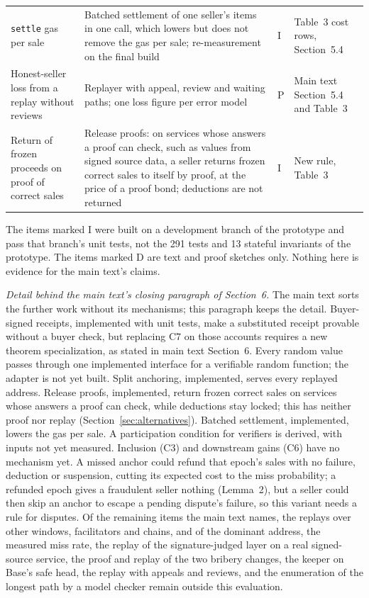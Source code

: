 \documentclass[10pt,a4paper]{article}
\theoremstyle{plain}
\theoremstyle{remark}
\begin{document}
\begin{table}[!htbp]
\begin{tabular}{@{}p{3.4cm}p{6.4cm}p{1.2cm}p{4.0cm}@{}}
\texttt{settle} gas per sale & Batched settlement of one seller's items in one call, which lowers but does not remove the gas per sale; re-measurement on the final build & I & Table~3 cost rows, Section~5.4 \\
Honest-seller loss from a replay without reviews & Replayer with appeal, review and waiting paths; one loss figure per error model & P & Main text Section~5.4 and Table~3 \\
Return of frozen proceeds on proof of correct sales & Release proofs: on services whose answers a proof can check, such as values from signed source data, a seller returns frozen correct sales to itself by proof, at the price of a proof bond; deductions are not returned & I & New rule, Table~3 \\
\bottomrule
\end{tabular}
\end{table}

The items marked I were built on a development branch of the prototype and pass that branch's unit tests, not the 291 tests and 13 stateful invariants of the prototype. The items marked D are text and proof sketches only. Nothing here is evidence for the main text's claims.

\emph{Detail behind the main text's closing paragraph of Section~6.} The main text sorts the further work without its mechanisms; this paragraph keeps the detail. Buyer-signed receipts, implemented with unit tests, make a substituted receipt provable without a buyer check, but replacing C7 on those accounts requires a new theorem specialization, as stated in main text Section~6. Every random value passes through one implemented interface for a verifiable random function; the adapter is not yet built. Split anchoring, implemented, serves every replayed address. Release proofs, implemented, return frozen correct sales on services whose answers a proof can check, while deductions stay locked; this has neither proof nor replay (Section~\ref{sec:alternatives}). Batched settlement, implemented, lowers the gas per sale. A participation condition for verifiers is derived, with inputs not yet measured. Inclusion (C3) and downstream gains (C6) have no mechanism yet. A missed anchor could refund that epoch's sales with no failure, deduction or suspension, cutting its expected cost to the miss probability; a refunded epoch gives a fraudulent seller nothing (Lemma~2), but a seller could then skip an anchor to escape a pending dispute's failure, so this variant needs a rule for disputes. Of the remaining items the main text names, the replays over other windows, facilitators and chains, and of the dominant address, the measured miss rate, the replay of the signature-judged layer on a real signed-source service, the proof and replay of the two bribery changes, the keeper on Base's safe head,  the replay with appeals and reviews, and the enumeration of the longest path by a model checker remain outside this evaluation.
\end{document}
